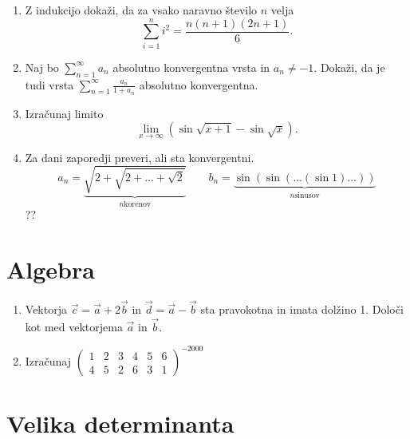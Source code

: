 \documentclass[a4paper,12pt]{article}
\begin{document}
\begin{enumerate}
\item
Z indukcijo dokaži, da za vsako naravno število \(n\) velja
\[
\sum_{i=1}^{n} i^2 = \frac{n(n+1)(2n+1)}{6}.
\]

\item
Naj bo \(\sum_{n=1}^{\infty} a_n\) absolutno konvergentna vrsta in \(a_n \ne -1\).
Dokaži, da je tudi vrsta \(\sum_{n=1}^\infty \frac{a_n}{1+a_n}\)
absolutno konvergentna.

\item
Izračunaj limito
\[
\lim_{x \to \infty} (\sin \sqrt{x+1} - \sin \sqrt{x} ).
\]

\item
Za dani zaporedji preveri, ali sta konvergentni.
\[
a_n = \underbrace{\sqrt{2+\sqrt{2+\dots+\sqrt{2}}}}_{n \text{korenov}} \qquad
b_n = \underbrace{\sin(\sin(\dots(\sin 1)\dots))}_{n \text{sinusov}}
\]
??
\end{enumerate}

\section*{Algebra}

\begin{enumerate}
\item
Vektorja \(\vec{c}=\vec{a}+2 \vec{b}\) in \( \vec{d} = \vec{a} - \vec{b}\)
sta pravokotna in imata dolžino 1. Določi kot med vektorjema \(\vec{a}\) in \(\vec{b}\).

\item
Izračunaj
\(\displaystyle
\begin{pmatrix}
    1 & 2 & 3 & 4 & 5 & 6 \\
  4 & 5 & 2 & 6 & 3 & 1
\end{pmatrix}^{-2000}
\)
\end{enumerate}

\section*{Velika determinanta}
\end{document}
